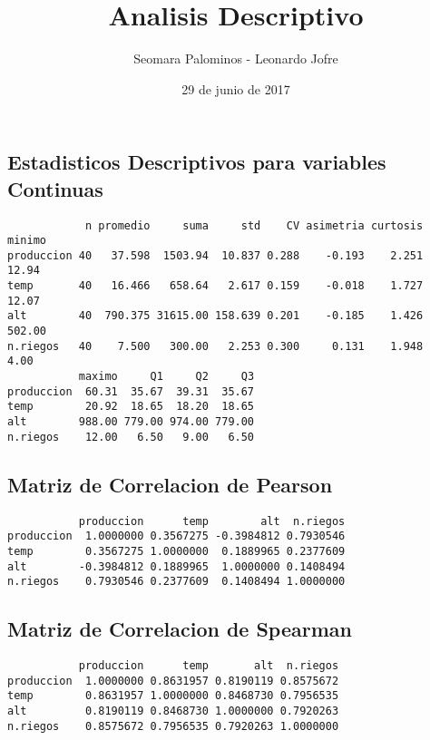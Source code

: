 \documentclass[]{article}
\title{Analisis Descriptivo}
\author{Seomara Palominos - Leonardo Jofre}
\date{29 de junio de 2017}
\begin{document}
\maketitle

\subsection{Estadisticos Descriptivos para variables
Continuas}\label{estadisticos-descriptivos-para-variables-continuas}

\begin{verbatim}
            n promedio     suma     std    CV asimetria curtosis minimo
produccion 40   37.598  1503.94  10.837 0.288    -0.193    2.251  12.94
temp       40   16.466   658.64   2.617 0.159    -0.018    1.727  12.07
alt        40  790.375 31615.00 158.639 0.201    -0.185    1.426 502.00
n.riegos   40    7.500   300.00   2.253 0.300     0.131    1.948   4.00
           maximo     Q1     Q2     Q3
produccion  60.31  35.67  39.31  35.67
temp        20.92  18.65  18.20  18.65
alt        988.00 779.00 974.00 779.00
n.riegos    12.00   6.50   9.00   6.50
\end{verbatim}

\subsection{Matriz de Correlacion de
Pearson}\label{matriz-de-correlacion-de-pearson}

\begin{verbatim}
           produccion      temp        alt  n.riegos
produccion  1.0000000 0.3567275 -0.3984812 0.7930546
temp        0.3567275 1.0000000  0.1889965 0.2377609
alt        -0.3984812 0.1889965  1.0000000 0.1408494
n.riegos    0.7930546 0.2377609  0.1408494 1.0000000
\end{verbatim}

\subsection{Matriz de Correlacion de
Spearman}\label{matriz-de-correlacion-de-spearman}

\begin{verbatim}
           produccion      temp       alt  n.riegos
produccion  1.0000000 0.8631957 0.8190119 0.8575672
temp        0.8631957 1.0000000 0.8468730 0.7956535
alt         0.8190119 0.8468730 1.0000000 0.7920263
n.riegos    0.8575672 0.7956535 0.7920263 1.0000000
\end{verbatim}
\end{document}
